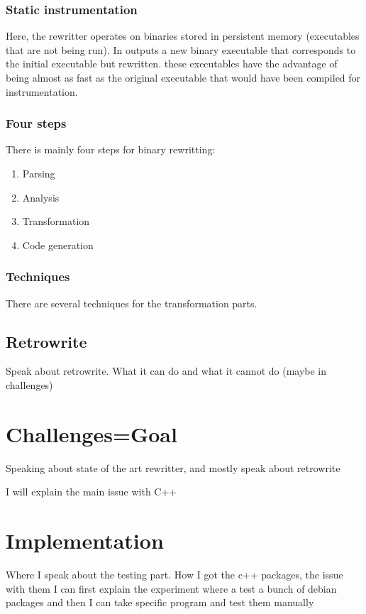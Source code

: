 \documentclass[a4paper,11pt,oneside]{report}
\begin{document}
\subsection{Static instrumentation}
Here, the rewritter operates on binaries stored in persistent memory
(executables that are not being run). In outputs a new binary executable that
corresponds to the initial executable but rewritten. these executables have the
advantage of being almost as fast as the original executable that would have
been compiled for instrumentation.
\subsection{Four steps}
There is mainly four steps for binary rewritting:
\begin{enumerate}
    \item Parsing
    \item Analysis
    \item Transformation
    \item Code generation
\end{enumerate}
\subsection{Techniques}
There are several techniques for the transformation parts. 





\section{Retrowrite}
Speak about retrowrite. What it can do and what it cannot do (maybe in challenges)



\chapter{Challenges=Goal}
Speaking about state of the art rewritter, and mostly
speak about retrowrite

I will explain the main issue with C++

\chapter{Implementation}
Where I speak about the testing part. How I got the c++ packages, the issue with them
I can first explain the experiment where a test a bunch of debian packages and
then I can take specific program and test them manually
\end{document}
